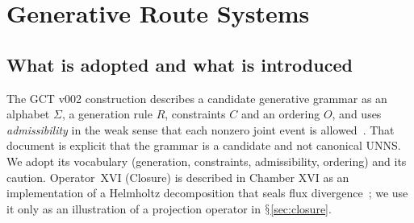 \documentclass[11pt,a4paper]{article}
\renewcommand{\S}{\ensuremath{\mathsection}}
\theoremstyle{plain}
\theoremstyle{definition}
\begin{document}
\section{Generative Route Systems}\label{sec:routes}

\subsection{What is adopted and what is introduced}\label{sec:adopt}
The GCT v002 construction describes a candidate generative grammar as an alphabet $\Sigma$, a generation rule $R$, constraints $C$ and an ordering $O$, and uses \emph{admissibility} in the weak sense that each nonzero joint event is allowed~\cite{G3}.
That document is explicit that the grammar is a candidate and not canonical UNNS.
We adopt its vocabulary (generation, constraints, admissibility, ordering) and its caution.
Operator~XVI (Closure) is described in Chamber XVI as an implementation of a Helmholtz decomposition that seals flux divergence~\cite{G7}; we use it only as an illustration of a projection operator in \S\ref{sec:closure}.
\end{document}
